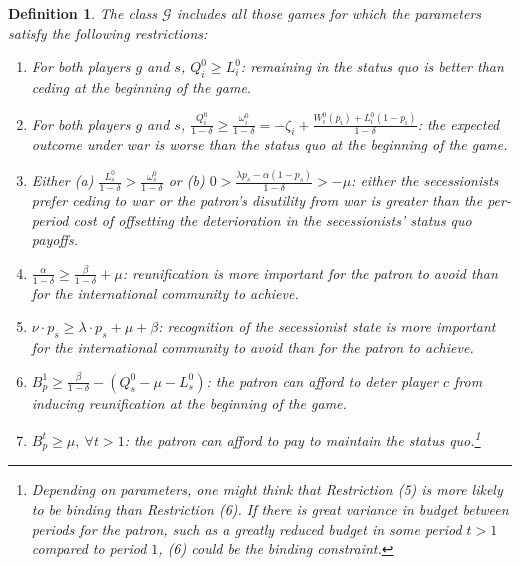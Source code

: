 \documentclass[11pt,letterpaper, notitlepage]{article}
\newtheorem{definition}{Definition}
\newcommand{\de}{\delta}
\begin{document}
\begin{definition}
\emph{The class $\mathcal{G}$ includes all those games for which the parameters satisfy the following restrictions:}

\begin{enumerate}
\item \textit{For both players $g$ and $s$, $Q_i^0 \geq L_i^0$: remaining in the status quo is better than ceding at the beginning of the game.}\label{res:1}

\item \textit{For both players $g$ and $s$, $\frac {Q_i^0}{1-\delta} \geq \frac {\omega_i^0}{1-\delta} = -\zeta_i+\frac{W_i^0(p_i) + L_i^0(1-p_i)}{1-\delta}$: the expected outcome under war is worse than the status quo at the beginning of the game.}\label{res:2}

\item \textit{Either (a) $\frac{L_s^0}{1-\delta}  > \frac{\omega_s^0}{1-\delta}$ or (b) $0 > \frac{\lambda p_s - \alpha (1-p_s)}{1-\de} > -\mu$: either the secessionists prefer ceding to war or the patron's disutility from war is greater than the per-period cost of offsetting the deterioration in the secessionists' status quo payoffs.}\label{res:new}

\item \textit{$\frac{\alpha}{1-\de} \geq \frac{\beta}{1-\de} + \mu$: reunification is more important for the patron to avoid than for the international community to achieve.}\label{res:3}

\item  \textit{$\nu\cdot p_s \geq \lambda \cdot p_s + \mu + \beta$: recognition of the secessionist state is more important for the international community to avoid than for the patron to achieve.}\label{res:4}

\item  \textit{$B_p^1 \geq\frac{\beta}{1-\delta} - \left(Q_s^0 -\mu - L_s^0 \right)$: the patron can afford to deter player $c$ from inducing reunification at the beginning of the game.}\label{res:5}

\item \textit{$B_p^t \geq \mu, \ \forall t>1$: the patron can afford to pay to maintain the status quo.}\footnote{Depending on parameters, one might think that Restriction (5) is more likely to be binding than Restriction (6). If there is great variance in budget between periods for the patron, such as a greatly reduced budget in some period $t> 1$ compared to period $1$, (6) could be the binding constraint.}\label{res:6}

\end{enumerate}
\end{definition}
\end{document}

